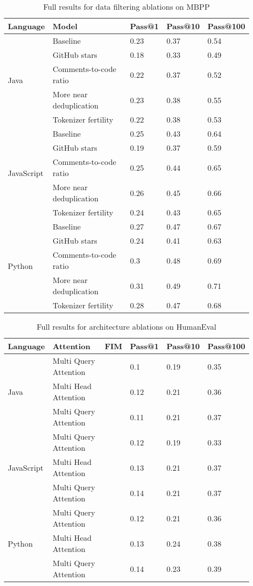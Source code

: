\documentclass[10pt]{article} \usepackage{iclr2023_conference,times}
\newcommand{\cmark}{\ding{51}}\newcommand{\xmark}{\ding{55}}
\begin{document}
\begin{table}[htbp]
\centering
\begin{tabular}{lllll}
\toprule
Language & Model & Pass@1 & Pass@10 & Pass@100\\
\midrule
\multirow{5}{*}{Java} & Baseline & 0.23 & 0.37 & 0.54\\
& GitHub stars & 0.18 & 0.33 & 0.49\\
& Comments-to-code ratio & 0.22 & 0.37 & 0.52\\
& More near deduplication & 0.23 & 0.38 & 0.55\\
& Tokenizer fertility & 0.22 & 0.38 & 0.53\\
\midrule
\multirow{5}{*}{JavaScript} & Baseline  & 0.25 & 0.43 & 0.64\\
& GitHub stars & 0.19 & 0.37 & 0.59\\
& Comments-to-code ratio & 0.25 & 0.44 & 0.65\\
& More near deduplication & 0.26 & 0.45 & 0.66\\
& Tokenizer fertility   & 0.24 & 0.43 & 0.65\\
\midrule
\multirow{5}{*}{Python} & Baseline & 0.27 & 0.47 & 0.67\\
& GitHub stars & 0.24 & 0.41 & 0.63\\
& Comments-to-code ratio & 0.3 & 0.48 & 0.69\\
& More near deduplication & 0.31 & 0.49 & 0.71\\
& Tokenizer fertility   & 0.28 & 0.47 & 0.68\\
\bottomrule
\end{tabular}
\caption{Full results for data filtering ablations on MBPP}
\label{table:filtering_mbpp}
\end{table}

\begin{table}[htbp]
\centering
\begin{tabular}{llllll}
\toprule
Language & Attention & FIM  & Pass@1 & Pass@10 & Pass@100\\
\midrule
\multirow{3}{*}{Java} & Multi Query Attention & \cmark & 0.1 & 0.19 & 0.35\\
& Multi Head Attention & \cmark & 0.12 & 0.21 & 0.36\\
& Multi Query Attention & \xmark & 0.11 & 0.21 & 0.37\\
\midrule
\multirow{3}{*}{JavaScript} & Multi Query Attention & \cmark & 0.12 & 0.19 & 0.33\\
& Multi Head Attention & \cmark & 0.13 & 0.21 & 0.37\\
& Multi Query Attention & \xmark & 0.14 & 0.21 & 0.37\\
\midrule
\multirow{3}{*}{Python} & Multi Query Attention & \cmark & 0.12 & 0.21 & 0.36\\
& Multi Head Attention & \cmark & 0.13 & 0.24 & 0.38\\
& Multi Query Attention & \xmark & 0.14 & 0.23 & 0.39\\
\bottomrule
\end{tabular}
\caption{Full results for architecture ablations on HumanEval}
\label{tab:architecture_humaneval}
\end{table}
\end{document}
